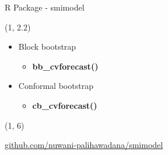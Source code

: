 \documentclass[
  12pt,
  ignorenonframetext,
  aspectratio=169,
]{beamer}
\begin{document}
\begin{frame}{R Package - smimodel}
\label{r-package---smimodel}

\begin{textblock}{10.2}(1, 2.2)
\fontsize{12}{14}\sf
\begin{block}{}
  \begin{itemize}
    \item Block bootstrap
    \begin{itemize}
      \item \color{violet} \textbf{bb\_cvforecast()} \newline
    \end{itemize}
    \item Conformal bootstrap
    \begin{itemize}
      \item \color{violet} \textbf{cb\_cvforecast()} \newline
    \end{itemize}
  \end{itemize}
\end{block}
\end{textblock}

\begin{textblock}{10.2}(1, 6)
\fontsize{11}{12}\sf
\begin{alertblock}{}
 \color{blue} \hspace*{0.8cm} \href{https://github.com/nuwani-palihawadana/smimodel}{github.com/nuwani-palihawadana/smimodel}
\end{alertblock}
\end{textblock}
\end{frame}

\begin{frame}{}
\label{section}
\end{frame}
\end{document}
